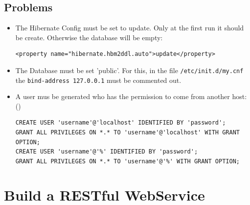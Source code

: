 \documentclass[12pt]{article}
\begin{document}
\subsection{Problems}
\begin{itemize}
\item 		The Hibernate Config must be set to update. Only at the first run it should be create. Otherwise the database will be empty: 
\begin{lstlisting}
<property name="hibernate.hbm2ddl.auto">update</property>
\end{lstlisting}
\item The Database must be set 'public'. For this, in the file \texttt{/etc/init.d/my.cnf} the \texttt{bind-address 127.0.0.1} must be commented out.
\item A user mus be generated who has the permission to come from another host: (\cite{hostpermisson})
\begin{lstlisting}
CREATE USER 'username'@'localhost' IDENTIFIED BY 'password';
GRANT ALL PRIVILEGES ON *.* TO 'username'@'localhost' WITH GRANT OPTION;
CREATE USER 'username'@'%' IDENTIFIED BY 'password';
GRANT ALL PRIVILEGES ON *.* TO 'username'@'%' WITH GRANT OPTION;
\end{lstlisting}
\end{itemize}




\section{Build a RESTful WebService}
\end{document}
